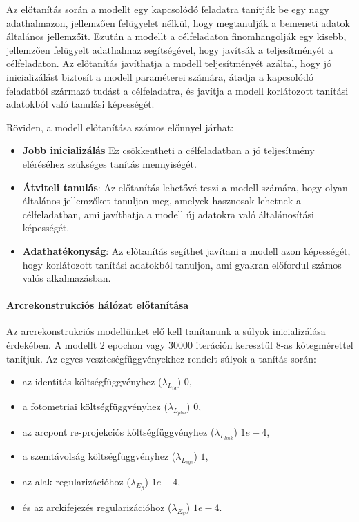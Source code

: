 \documentclass[12pt,a4]{article}
\begin{document}
        Az előtanítás során a modellt egy kapcsolódó feladatra tanítják be egy nagy adathalmazon, jellemzően felügyelet nélkül, hogy megtanulják a bemeneti adatok általános jellemzőit. Ezután a modellt a célfeladaton finomhangolják egy kisebb, jellemzően felügyelt adathalmaz segítségével, hogy javítsák a teljesítményét a célfeladaton. Az előtanítás javíthatja a modell teljesítményét azáltal, hogy jó inicializálást biztosít a modell paraméterei számára, átadja a kapcsolódó feladatból származó tudást a célfeladatra, és javítja a modell korlátozott tanítási adatokból való tanulási képességét.

        Röviden, a modell előtanítása számos előnnyel járhat:
        \begin{itemize}
            \item \textbf{ Jobb inicializálás} Ez csökkentheti a célfeladatban a jó teljesítmény eléréséhez szükséges tanítás mennyiségét.

            \item \textbf{Átviteli tanulás}: Az előtanítás lehetővé teszi a modell számára, hogy olyan általános jellemzőket tanuljon meg, amelyek hasznosak lehetnek a célfeladatban, ami javíthatja a modell új adatokra való általánosítási képességét.

            \item \textbf{Adathatékonyság}: Az előtanítás segíthet javítani a modell azon képességét, hogy korlátozott tanítási adatokból tanuljon, ami gyakran előfordul számos valós alkalmazásban.
            
        \end{itemize}
        \paragraph{Arcrekonstrukciós hálózat előtanítása} \label{facepretrainsec}

        Az arcrekonstrukciós modellünket elő kell tanítanunk a súlyok inicializálása érdekében. 
        A modellt $2$ epochon vagy $30000$ iteráción keresztül 8-as kötegmérettel tanítjuk. 
        Az egyes veszteségfüggvényekhez rendelt súlyok a tanítás során:
        \begin{itemize}
            \item az identitás költségfüggvényhez ($\lambda_{L_{id}}$) $0$,
            \item a fotometriai költségfüggvényhez ($\lambda_{L_{pho}}$) $0$,
            \item az arcpont re-projekciós költségfüggvényhez ($\lambda_{L_{lmk}}$) $1e - 4$, 
            \item  a szemtávolság költségfüggvényhez ($\lambda_{L_{eye}}$) $1$,
            \item  az alak regularizációhoz ($\lambda_{E_{\beta}}$)  $1e - 4$, 
            \item  és az arckifejezés regularizációhoz ($\lambda_{E_{\psi}}$) $1e - 4$.
        \end{itemize}
\end{document}

